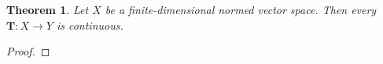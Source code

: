 \documentclass[11pt]{article}
\newtheorem{theorem}{Theorem}
\newcommand{\mat}[1]{\mathbf{#1}}
\begin{document}
\begin{theorem} 
  Let $X$ be a finite-dimensional normed vector space. Then every $\mat{T} : X \to Y$ is continuous.
\end{theorem}
\begin{adjustwidth}{0.5cm}{}
  \begin{proof}
    
  \end{proof}
\end{adjustwidth}

\end{document}
